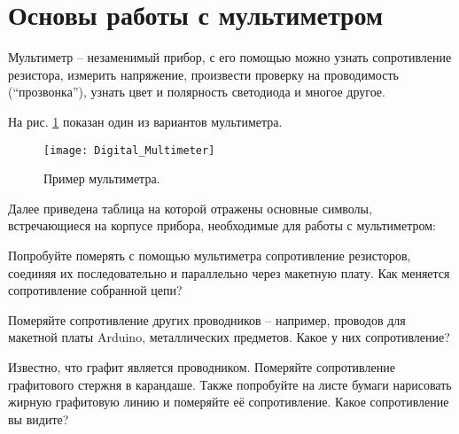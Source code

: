 \documentclass[../main.tex]{subfiles}
\begin{document}
\section{Основы работы с мультиметром}

Мультиметр -- незаменимый прибор, с его помощью можно узнать сопротивление
резистора, измерить напряжение, произвести проверку на проводимость
(``прозвонка''), узнать цвет и полярность светодиода и многое другое.

На рис. \ref{fig:multimeter-example} показан один из вариантов мультиметра.

\begin{figure}[ht]
  \centering
  \caption{Пример мультиметра.}
  \texttt{[image: Digital\_Multimeter]}
  \label{fig:multimeter-example}
\end{figure}

Далее приведена таблица на которой отражены основные символы, встречающиеся на
корпусе прибора, необходимые для работы с мультиметром:


 { Попробуйте померять с помощью мультиметра сопротивление
  резисторов, соединяя их последовательно и параллельно через макетную плату.
  Как меняется сопротивление собранной цепи? }

 { Померяйте сопротивление других проводников -- например, проводов
  для макетной платы Arduino, металлических предметов. Какое у них
  сопротивление?}

 { Известно, что графит является проводником. Померяйте
  сопротивление графитового стержня в карандаше.  Также попробуйте на листе
  бумаги нарисовать жирную графитовую линию и померяйте её сопротивление.  Какое
  сопротивление вы видите? }
\end{document}
